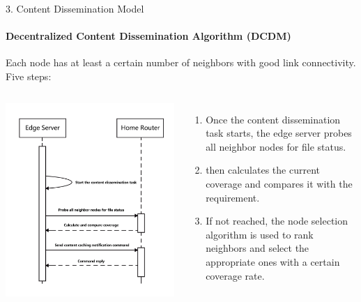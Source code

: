 \documentclass{beamer}		%
\begin{document}
\begin{frame}{3. Content Dissemination Model}
\framesubtitle{Decentralized Content Dissemination Algorithm (DCDM)}
Each node has at least a certain number of neighbors with good link connectivity. Five steps:
\begin{columns}
\includegraphics[scale=0.08]{imgs/Figure1.png}
\begin{enumerate}
    \item[1.] Once the content dissemination task starts, the edge server probes all neighbor nodes for file status.
    \item[2.] then calculates the current coverage and compares it with the requirement.
    \item[3.] If not reached, the node selection algorithm is used to rank neighbors and select the appropriate ones with a certain coverage rate.
\end{enumerate}
\end{columns}
\end{frame}
\end{document}
